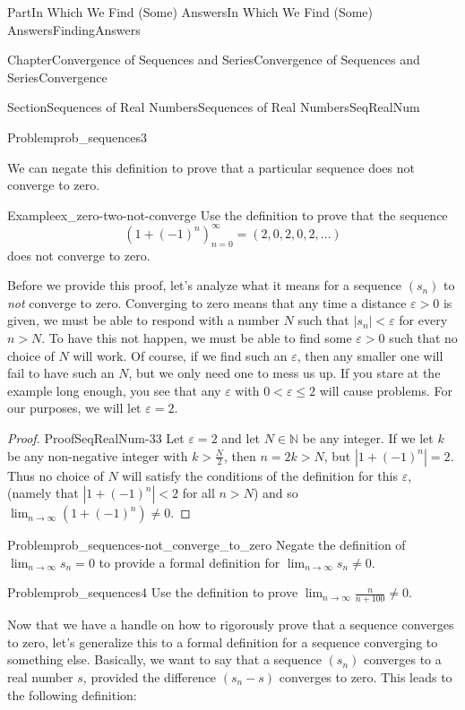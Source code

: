 \documentclass[oneside,10pt,]{book}
\numberwithin{equation}{part}
\def\limitt#1#2#3{{\displaystyle\lim_{#1\rightarrow #2}\textstyle #3}}
\newcommand{\eps}{\varepsilon}
\newcommand{\NN}{\mathbb {N}}
\newcommand{\lt}{<}
\begin{document}
\begin{partptx}{Part}{In Which We Find (Some) Answers}{}{In Which We Find (Some) Answers}{}{}{FindingAnswers}
\begin{chapterptx}{Chapter}{Convergence of Sequences and Series}{}{Convergence of Sequences and Series}{}{}{Convergence}
\begin{sectionptx}{Section}{Sequences of Real Numbers}{}{Sequences of Real Numbers}{}{}{SeqRealNum}
\begin{problem}{Problem}{}{prob_sequences3}
\begin{enumerate}[font=\bfseries,label=(\alph*),ref=\alph*]
\end{enumerate}%
\end{problem}
We can negate this definition to prove that a particular sequence does not converge to zero.%
\begin{example}{Example}{}{ex_zero-two-not-converge}%
Use the definition to prove that the sequence%
\begin{equation*}
\left(1+(-1)^n\right)_{n=0}^\infty=(2,0,2,0,2,\ldots)
\end{equation*}
does not converge to zero.%
\end{example}
Before we provide this proof, let's analyze what it means for a sequence \(\left(s_n\right)\) to \emph{not} converge to zero.  Converging to zero means that any time a distance \(\eps>0\) is given, we must be able to respond with a number \(N\) such that \(|s_n|\lt \eps\) for every \(n>N\).  To have this not happen, we must be able to find some \(\eps>0\) such that no choice of \(N\) will work.  Of course, if we find such an \(\eps\), then any smaller one will fail to have such an \(N\), but we only need one to mess us up.  If you stare at the example long enough, you see that any \(\eps\) with \(0\lt
\eps\leq 2\) will cause problems.  For our purposes, we will let \(\eps=2\).%
\begin{proof}{Proof}{}{SeqRealNum-33}
Let \(\eps=2\) and let \(N\in\NN\) be any integer. If we let \(k\) be any non-negative integer with \(k>\frac{N}{2}\), then \(n=2k>N\), but \(|1+(-1)^n|=2\). Thus no choice of \(N\) will satisfy the conditions of the definition for this \(\eps\), (namely that \(|1+(-1)^n|\lt 2\) for all \(n>N\)) and so \(\lim_{n\rightarrow\infty}\left(1+(-1)^n\right)\neq 0\).%
\end{proof}
\begin{problem}{Problem}{}{prob_sequences-not_converge_to_zero}%
 Negate the definition of \(\lim_{n\rightarrow\infty}s_n=0\) to provide a formal definition for \(\limitt{n}{\infty}{s_n}\neq 0\).%
\end{problem}
\begin{problem}{Problem}{}{prob_sequences4}%
Use the definition to prove \(\limitt{n}{\infty}{\frac{n}{n+100}}\neq 0\).%
\end{problem}
Now that we have a handle on how to rigorously prove that a sequence converges to zero, let's generalize this to a formal definition for a sequence converging to something else. Basically, we want to say that a sequence \(\left(s_n\right)\) converges to a real number \(s\), provided the difference \(\left(s_n-s\right)\) converges to zero. This leads to the following definition:%

\end{sectionptx}
\end{chapterptx}
\end{partptx}
\end{document}
